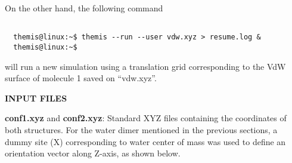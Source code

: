 \documentclass{achemso}
\begin{document}
  On the other hand, the following command

\begin{center}
  \begin{minipage}{0.55\textwidth}
    \vskip0.25cm
    \begin{verbatim}

  themis@linux:~$ themis --run --user vdw.xyz > resume.log &
  themis@linux:~$ 

    \end{verbatim}
  \end{minipage}
\end{center}

  will run a new simulation using a translation grid corresponding to the VdW
  surface of molecule 1 saved on ``vdw.xyz''.

\newpage

\begin{center}
  \textbf{INPUT FILES}
  \vskip0.5cm
\end{center}


\textbf{conf1.xyz} and \textbf{conf2.xyz}: Standard XYZ files containing the
  coordinates of both structures. For the water dimer mentioned in the previous
  sections, a dummy site (X) corresponding to water center of mass was used to
  define an orientation vector along Z-axis, as shown below. \\~
\end{document}
